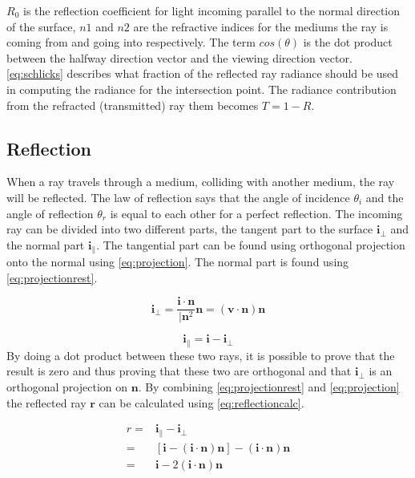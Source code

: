 \documentclass[a4paper, 12pt]{report}
\begin{document}
$R_0$ is the reflection coefficient for light incoming parallel to the normal direction of the surface, $n1$ and $n2$ are the refractive indices for the mediums the ray is coming from and going into respectively.
The term $cos(\theta)$ is the dot product between the halfway direction vector and the viewing direction vector.
\autoref{eq:schlicks} describes what fraction of the reflected ray radiance should be used in computing the radiance for the intersection point. 
The radiance contribution from the refracted (transmitted) ray them becomes $T=1-R$.

\subsection{Reflection}
When a ray travels through a medium, colliding with another medium, the ray will be reflected.
The law of reflection says that the angle of incidence $\theta_i$ and the angle of reflection $ \theta_r $ is equal to each other for a perfect reflection.
The incoming ray can be divided into two different parts, the tangent part to the surface $ \mathbf{i}_\bot $ and the normal part $ \mathbf{i}_\| $.
The tangential part can be found using orthogonal projection onto the normal using \autoref{eq:projection}. 
The normal part is found using \autoref{eq:projectionrest}.

\begin{equation} \label{eq:projection}
\mathbf{i}_\bot = \frac{\mathbf{i} \cdot \mathbf{n}} {\vert \mathbf{n}^2} \mathbf{n} = (\mathbf{v} \cdot \mathbf{n})\mathbf{n}
\end{equation}

\begin{equation} \label{eq:projectionrest}
\mathbf{i}_\| = \mathbf{i} - \mathbf{i}_\bot
\end{equation}
By doing a dot product between these two rays, it is possible to prove that the result is zero and thus proving that these two are orthogonal and that $ \mathbf{i}_\bot $ is an orthogonal projection on $ \mathbf{n} $. 
By combining \autoref{eq:projectionrest} and \autoref{eq:projection} the reflected ray $ \mathbf{r} $ can be calculated using \autoref{eq:reflectioncalc}.

\begin{subequations}\label{eq:reflectioncalc}
\begin{align}
r =& \mathbf{i}_\| - \mathbf{i}_\bot \\
  =& [\mathbf{i} - (\mathbf{i} \cdot \mathbf{n})\mathbf{n}] - (\mathbf{i} \cdot \mathbf{n}) \mathbf{n} \\
  =& \mathbf{i} - 2 ( \mathbf{i} \cdot \mathbf{n} ) \mathbf{n}
\end{align}
\end{subequations}
\end{document}
